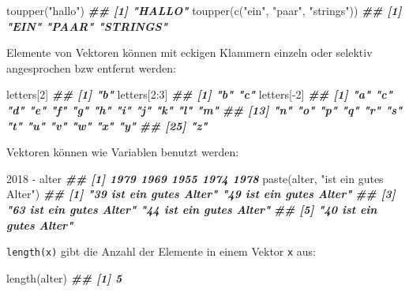 \documentclass[
  ngerman,
]{article}
\newenvironment{Shaded}{\begin{snugshade}}{\end{snugshade}}
\newcommand{\DecValTok}[1]{\textcolor[rgb]{0.00,0.00,0.81}{#1}}
\newcommand{\DocumentationTok}[1]{\textcolor[rgb]{0.56,0.35,0.01}{\textbf{\textit{#1}}}}
\newcommand{\FunctionTok}[1]{\textcolor[rgb]{0.00,0.00,0.00}{#1}}
\newcommand{\NormalTok}[1]{#1}
\newcommand{\SpecialCharTok}[1]{\textcolor[rgb]{0.00,0.00,0.00}{#1}}
\newcommand{\StringTok}[1]{\textcolor[rgb]{0.31,0.60,0.02}{#1}}
\begin{document}
\begin{Shaded}
\begin{Highlighting}[]
\FunctionTok{toupper}\NormalTok{(}\StringTok{"hallo"}\NormalTok{)}
\DocumentationTok{\#\# [1] "HALLO"}
\FunctionTok{toupper}\NormalTok{(}\FunctionTok{c}\NormalTok{(}\StringTok{"ein"}\NormalTok{, }\StringTok{"paar"}\NormalTok{, }\StringTok{"strings"}\NormalTok{))}
\DocumentationTok{\#\# [1] "EIN"     "PAAR"    "STRINGS"}
\end{Highlighting}
\end{Shaded}

Elemente von Vektoren können mit eckigen Klammern einzeln oder selektiv angesprochen bzw entfernt werden:

\begin{Shaded}
\begin{Highlighting}[]
\NormalTok{letters[}\DecValTok{2}\NormalTok{]}
\DocumentationTok{\#\# [1] "b"}
\NormalTok{letters[}\DecValTok{2}\SpecialCharTok{:}\DecValTok{3}\NormalTok{]}
\DocumentationTok{\#\# [1] "b" "c"}
\NormalTok{letters[}\SpecialCharTok{{-}}\DecValTok{2}\NormalTok{]}
\DocumentationTok{\#\#  [1] "a" "c" "d" "e" "f" "g" "h" "i" "j" "k" "l" "m"}
\DocumentationTok{\#\# [13] "n" "o" "p" "q" "r" "s" "t" "u" "v" "w" "x" "y"}
\DocumentationTok{\#\# [25] "z"}
\end{Highlighting}
\end{Shaded}

Vektoren können wie Variablen benutzt werden:

\begin{Shaded}
\begin{Highlighting}[]
\DecValTok{2018} \SpecialCharTok{{-}}\NormalTok{ alter}
\DocumentationTok{\#\# [1] 1979 1969 1955 1974 1978}
\FunctionTok{paste}\NormalTok{(alter, }\StringTok{"ist ein gutes Alter"}\NormalTok{)}
\DocumentationTok{\#\# [1] "39 ist ein gutes Alter" "49 ist ein gutes Alter"}
\DocumentationTok{\#\# [3] "63 ist ein gutes Alter" "44 ist ein gutes Alter"}
\DocumentationTok{\#\# [5] "40 ist ein gutes Alter"}
\end{Highlighting}
\end{Shaded}

\texttt{length(x)} gibt die Anzahl der Elemente in einem Vektor \texttt{x} aus:

\begin{Shaded}
\begin{Highlighting}[]
\FunctionTok{length}\NormalTok{(alter)}
\DocumentationTok{\#\# [1] 5}
\end{Highlighting}
\end{Shaded}
\end{document}

